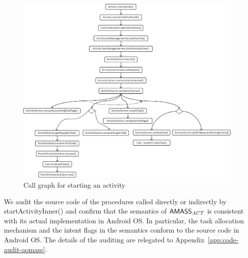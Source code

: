 \begin{figure}[htbp]
        \centering
        \includegraphics[scale = 0.55]{startActivity.pdf}
        \caption{Call graph for starting an activity}
    \label{fig:startActivity}
\end{figure}

We audit the source code of the procedures called directly or indirectly by startActivityInner() and confirm that the semantics of $\textsf{AMASS}_{ACT}$ is consistent with its actual implementation in Android OS. In particular, the task allocation mechanism and the intent flags in the semantics conform to the source code in Android OS.
The details of the auditing are relegated to Appendix~\ref{app:code-audit-aomass}. 

